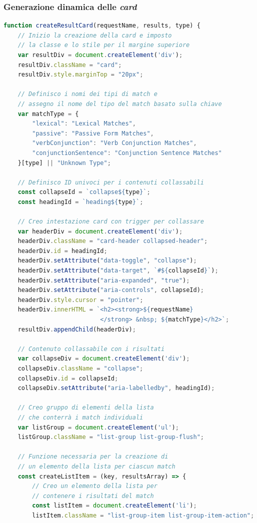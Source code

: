 \documentclass[12pt]{report}
\begin{document}
\subsubsection{Generazione dinamica delle \textit{card}}
\begin{lstlisting}[language=JavaScript]
function createResultCard(requestName, results, type) {
    // Inizio la creazione della card e imposto
    // la classe e lo stile per il margine superiore
    var resultDiv = document.createElement('div');
    resultDiv.className = "card";
    resultDiv.style.marginTop = "20px";

    // Definisco i nomi dei tipi di match e
    // assegno il nome del tipo del match basato sulla chiave
    var matchType = {
        "lexical": "Lexical Matches",
        "passive": "Passive Form Matches",
        "verbConjunction": "Verb Conjunction Matches",
        "conjunctionSentence": "Conjunction Sentence Matches"
    }[type] || "Unknown Type";

    // Definisco ID univoci per i contenuti collassabili
    const collapseId = `collapse${type}`;
    const headingId = `heading${type}`;

    // Creo intestazione card con trigger per collassare
    var headerDiv = document.createElement('div');
    headerDiv.className = "card-header collapsed-header";
    headerDiv.id = headingId;
    headerDiv.setAttribute("data-toggle", "collapse");
    headerDiv.setAttribute("data-target", `#${collapseId}`);
    headerDiv.setAttribute("aria-expanded", "true");
    headerDiv.setAttribute("aria-controls", collapseId);
    headerDiv.style.cursor = "pointer";
    headerDiv.innerHTML = `<h2><strong>${requestName}
                           </strong> &nbsp; ${matchType}</h2>`;
    resultDiv.appendChild(headerDiv);

    // Contenuto collassabile con i risultati
    var collapseDiv = document.createElement('div');
    collapseDiv.className = "collapse";
    collapseDiv.id = collapseId;
    collapseDiv.setAttribute("aria-labelledby", headingId);

    // Creo gruppo di elementi della lista
    // che conterrà i match individuali
    var listGroup = document.createElement('ul');
    listGroup.className = "list-group list-group-flush";

    // Funzione necessaria per la creazione di
    // un elemento della lista per ciascun match
    const createListItem = (key, resultsArray) => {
        // Creo un elemento della lista per
        // contenere i risultati del match
        const listItem = document.createElement('li');
        listItem.className = "list-group-item list-group-item-action";


\end{lstlisting}
\end{document}
